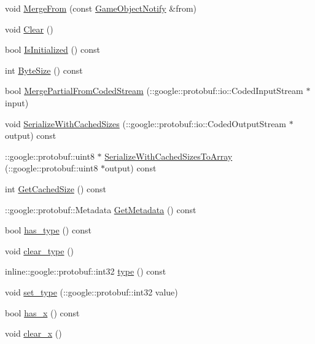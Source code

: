 \begin{DoxyCompactItemize}
\item 
void \hyperlink{class_game_object_notify_a185bd7dc2f070e9e98fa12158d160dad}{Merge\-From} (const \hyperlink{class_game_object_notify}{Game\-Object\-Notify} \&from)
\item 
void \hyperlink{class_game_object_notify_a7f116fae390b87419a829241f6ea0197}{Clear} ()
\item 
bool \hyperlink{class_game_object_notify_a4a821d184827fdafccab3a697dc666c6}{Is\-Initialized} () const 
\item 
int \hyperlink{class_game_object_notify_a63635477dec6ef117cc2e20e9a9f55dd}{Byte\-Size} () const 
\item 
bool \hyperlink{class_game_object_notify_aaa19ace0d7b2ce545036315be7509456}{Merge\-Partial\-From\-Coded\-Stream} (\-::google\-::protobuf\-::io\-::\-Coded\-Input\-Stream $\ast$input)
\item 
void \hyperlink{class_game_object_notify_a7995608370fc8c5c03a9358a9efbfa85}{Serialize\-With\-Cached\-Sizes} (\-::google\-::protobuf\-::io\-::\-Coded\-Output\-Stream $\ast$output) const 
\item 
\-::google\-::protobuf\-::uint8 $\ast$ \hyperlink{class_game_object_notify_ab5cc1ecedbad464ce4c41eecb433578a}{Serialize\-With\-Cached\-Sizes\-To\-Array} (\-::google\-::protobuf\-::uint8 $\ast$output) const 
\item 
int \hyperlink{class_game_object_notify_a5acae24a360fd54d2d7205008062ecc5}{Get\-Cached\-Size} () const 
\item 
\-::google\-::protobuf\-::\-Metadata \hyperlink{class_game_object_notify_acd92d4fc01971fb1ee172cf5a31e62e0}{Get\-Metadata} () const 
\item 
bool \hyperlink{class_game_object_notify_a986b979c2aa32d4e32c252b669a9b77f}{has\-\_\-type} () const 
\item 
void \hyperlink{class_game_object_notify_af14051d1680998ba235723a1ce0fd2b6}{clear\-\_\-type} ()
\item 
inline\-::google\-::protobuf\-::int32 \hyperlink{class_game_object_notify_ae8d17de08521388d76f137110050bf13}{type} () const 
\item 
void \hyperlink{class_game_object_notify_a7fe38481f8de7d9692856779d01b92db}{set\-\_\-type} (\-::google\-::protobuf\-::int32 value)
\item 
bool \hyperlink{class_game_object_notify_a716aa746890feeaeddfdafc070416c56}{has\-\_\-x} () const 
\item 
void \hyperlink{class_game_object_notify_a64d8f47b2e78c603f6d0133480a869ec}{clear\-\_\-x} ()

\end{DoxyCompactItemize}
